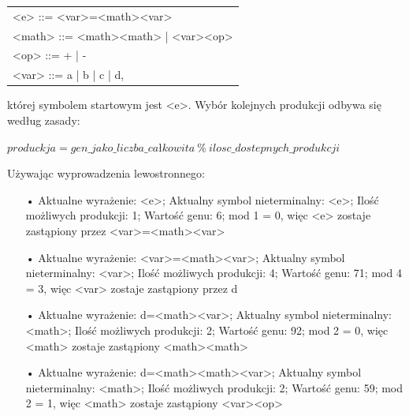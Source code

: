  \begin{center}
  \begin{tabular}{l}
    <e> ::= <var>=<math><var> \\
	<math> ::= <math><math> | <var><op> \\
	<op> ::= + | - \\
	<var> ::= a | b | c | d,
  \end{tabular}
 \end{center}

której symbolem startowym jest <e>. 
Wybór kolejnych produkcji odbywa się według zasady:
\begin{center} $produckja = gen\_jako\_liczba\_całkowita\ \%\ ilosc\_dostepnych\_produkcji$ \end{center}
Używając wyprowadzenia lewostronnego:

\begin{itemize}
  \item[•] Aktualne wyrażenie: <e>; \newline
Aktualny symbol nieterminalny: <e>; \newline
Ilość możliwych produkcji: 1; \newline
Wartość genu: 6;  mod 1 = 0, więc <e> zostaje zastąpiony przez <var>=<math><var>
  \item[•] Aktualne wyrażenie: <var>=<math><var>; \newline
Aktualny symbol nieterminalny: <var>; \newline
Ilość możliwych produkcji: 4; \newline
Wartość genu: 71;  mod 4 = 3, więc <var> zostaje zastąpiony przez d
  \item[•] Aktualne wyrażenie: d=<math><var>; \newline
Aktualny symbol nieterminalny: <math>; \newline
Ilość możliwych produkcji: 2; \newline
Wartość genu: 92;  mod 2 = 0, więc <math> zostaje zastąpiony <math><math>
  \item[•] Aktualne wyrażenie: d=<math><math><var>; \newline
Aktualny symbol nieterminalny: <math>; \newline
Ilość możliwych produkcji: 2; \newline
Wartość genu: 59;  mod 2 = 1, więc <math> zostaje zastąpiony <var><op>
\end{itemize}
